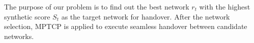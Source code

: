 \documentclass[conference]{IEEEtran}
\begin{document}
\begin{comment}
	The attribute utility vector $U_g $ of network $r_i$ can be calculated by $M^t$,
	To evaluate network performance, let $S_i$  represents the synthetic score of network $r_i$ that take into account  service requirements, user preference. $S_i$ is defined as follows.
	\begin{equation}   
	\label{equ041}
	{S_i} = \sum\nolimits_{g = 1}^Y {{p_g}}  \cdot W_g \cdot {U^T_g},
	\end{equation}
	Where ${U_g} = \left[ {u_g^1,u_g^2, \ldots ,u_g^N} \right]$, $g = 1,\dots ,Y$,   indicates the attribute utility vector for service $s_g$ and is calculated by collected network attributes $M^t$ defined as follows. 
	\begin{equation}   
	\label{equ051}
	{M^t} = {({m_{ij}})_{M \times N}}  ,
	\end{equation}
	In which $ m_{ij}$ indicates the attribute $c_j$  detected value of network $r_i$content...
\end{comment} 


The purpose of our problem is to find out the best network $r_t$ with the highest synthetic score $S_t$ as the target network for handover. After the network selection, MPTCP is applied to execute seamless  handover between candidate networks.   



\begin{comment}
	\begin{figure}[htbp!]
	\centering
	\texttt{[image: figures/algorithmframe1.pdf]}
	\caption{Network selection algorithm framework.}\label{fig:algorithmframe1}
	\vspace{-1em}
	\end{figure}content...
\end{comment}
\end{document}
